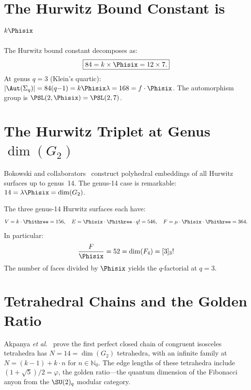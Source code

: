 \section{The Hurwitz Bound Constant is $k\Phisix$}
\label{sec:hurwitz-bound}

\begin{theorem}
The Hurwitz bound constant decomposes as:
\begin{equation}
\boxed{84 = k\times\Phisix = 12\times 7.}
\end{equation}
At genus $q=3$ (Klein's quartic):
$|\Aut(\Sigma_q)| = 84(q{-}1) = k\Phisix\lambda = 168 = f\cdot\Phisix$.
The automorphism group is $\PSL(2,\Phisix)=\PSL(2,7)$.
\end{theorem}


\section{The Hurwitz Triplet at Genus $\dim(G_2)$}
\label{sec:hurwitz-triplet}

Bokowski and collaborators~\cite{Bokowski2025} construct polyhedral
embeddings of all Hurwitz surfaces up to genus~14.
The genus-14 case is remarkable: $14 = \lambda\Phisix = \dim(G_2)$.

\begin{theorem}
The three genus-14 Hurwitz surfaces each have:
\begin{equation}
V = k\cdot\Phithree = 156, \quad
E = \Phisix\cdot\Phithree\cdot q! = 546, \quad
F = \mu\cdot\Phisix\cdot\Phithree = 364.
\end{equation}
In particular:
\begin{equation}
\frac{F}{\Phisix} = 52 = \dim(F_4) = [3]_3!
\end{equation}
The number of faces divided by $\Phisix$ yields the $q$-factorial at $q=3$.
\end{theorem}


\section{Tetrahedral Chains and the Golden Ratio}
\label{sec:tet-chains}

Akpanya \emph{et al.}~\cite{Akpanya2026} prove the first perfect
closed chain of congruent isosceles tetrahedra has
$N = 14 = \dim(G_2)$ tetrahedra, with an infinite family at
$N = (k{-}1) + k\cdot n$ for $n\in\mathbb{N}_0$.
The edge lengths of these tetrahedra include
$(1+\sqrt{5})/2 = \varphi$, the golden ratio---the quantum
dimension of the Fibonacci anyon from the $\SU(2)_q$ modular category.


